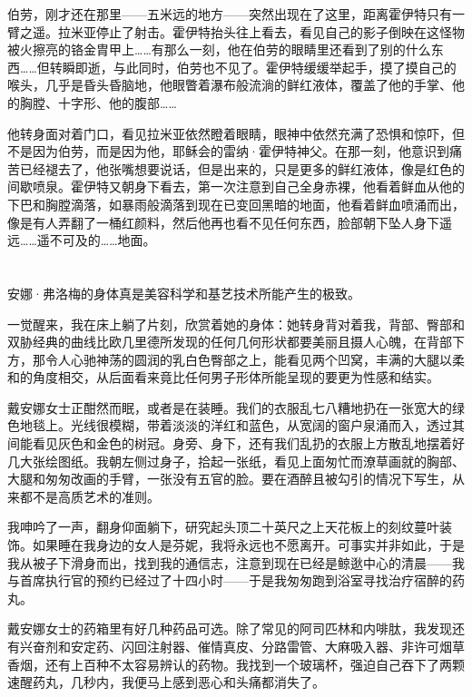 \documentclass[AutoFakeBold=true]{book}
\begin{document}
伯劳，刚才还在{\kaishu 那里}——五米远的地方——突然出现在了{\kaishu 这里}，距离霍伊特只有一臂之遥。拉米亚停止了射击。霍伊特抬头往上看去，看见自己的影子倒映在这怪物被火擦亮的铬金胄甲上……有那么一刻，他在伯劳的眼睛里还看到了别的什么东西……但转瞬即逝，与此同时，伯劳也不见了。霍伊特缓缓举起手，摸了摸自己的喉头，几乎是昏头昏脑地，他眼瞥着瀑布般流淌的鲜红液体，覆盖了他的手掌、他的胸膛、十字形、他的腹部……

他转身面对着门口，看见拉米亚依然瞪着眼睛，眼神中依然充满了恐惧和惊吓，但不是因为伯劳，而是因为他，耶稣会的雷纳·霍伊特神父。在那一刻，他意识到痛苦已经{\kaishu 褪去了}，他张嘴想要说话，但是出来的，只是更多的鲜红液体，像是红色的间歇喷泉。霍伊特又朝身下看去，第一次注意到自己全身赤裸，他看着鲜血从他的下巴和胸膛滴落，如暴雨般滴落到现在已变回黑暗的地面，他看着鲜血喷涌而出，像是有人弄翻了一桶红颜料，然后他再也看不见任何东西，脸部朝下坠人身下遥远……遥不可及的……地面。

\chapter{}

安娜·弗洛梅的身体真是美容科学和基艺技术所能产生的极致。

一觉醒来，我在床上躺了片刻，欣赏着她的身体：她转身背对着我，背部、臀部和双胁经典的曲线比欧几里德所发现的任何几何形状都要美丽且摄人心魄，在背部下方，那令人心驰神荡的圆润的乳白色臀部之上，能看见两个凹窝，丰满的大腿以柔和的角度相交，从后面看来竟比任何男子形体所能呈现的要更为性感和结实。

戴安娜女士正酣然而眠，或者是在装睡。我们的衣服乱七八糟地扔在一张宽大的绿色地毯上。光线很模糊，带着淡淡的洋红和蓝色，从宽阔的窗户泉涌而入，透过其间能看见灰色和金色的树冠。身旁、身下，还有我们乱扔的衣服上方散乱地摆着好几大张绘图纸。我朝左侧过身子，拾起一张纸，看见上面匆忙而潦草画就的胸部、大腿和匆匆改画的手臂，一张没有五官的脸。要在酒醉且被勾引的情况下写生，从来都不是高质艺术的准则。

我呻吟了一声，翻身仰面躺下，研究起头顶二十英尺之上天花板上的刻纹蔓叶装饰。如果睡在我身边的女人是芬妮，我将永远也不愿离开。可事实并非如此，于是我从被子下滑身而出，找到我的通信志，注意到现在已经是鲸逖中心的清晨——我与首席执行官的预约已经过了十四小时——于是我匆匆跑到浴室寻找治疗宿醉的药丸。

戴安娜女士的药箱里有好几种药品可选。除了常见的阿司匹林和内啡肽，我发现还有兴奋剂和安定药、闪回注射器、催情真皮、分路雷管、大麻吸入器、非许可烟草香烟，还有上百种不太容易辨认的药物。我找到一个玻璃杯，强迫自己吞下了两颗速醒药丸，几秒内，我便马上感到恶心和头痛都消失了。
\end{document}
